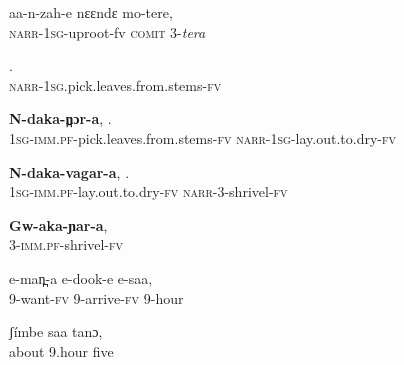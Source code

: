\documentclass[output=paper]{LSP/langsci}
\begin{document}
 \begin{exe}
 \label{Saapp6}
\gll aa-n-zah-e nɛɛndɛ mo-tere,\\
\textsc{narr}-\textsc{1sg}-uproot-fv   \textsc{comit}   \textsc{3}-\textit{tera}\\
\glt {}
\end{exe}

 \begin{exe}
 \label{Saapp7}
\gll \underline{}.\\
\textsc{narr-1sg.}pick.leaves.from.stems\textsc{-fv}\\
\glt {}
\end{exe}

 \begin{exe}
 \label{Saapp8}
\gll \textbf{N-daka-n̪ɔr-a},          \underline{}.\\
\textsc{1sg}-\textsc{imm.pf-}pick.leaves.from.stems-\textsc{fv}  \textsc{narr-1sg}-lay.out.to.dry-\textsc{fv}\\
\glt {}
\end{exe}

 \begin{exe}
 \label{Saapp9}
\gll \textbf{N-daka-vagar-a},      \underline{}.\\
\textsc{1sg-imm.pf-}lay.out.to.dry-\textsc{fv}  \textsc{narr-3}-shrivel-\textsc{fv}\\
\glt {}
\end{exe}

 \begin{exe}
 \label{Saapp10}
\gll \textbf{Gw-aka-ɲar-a},\\
\textsc{3}-\textsc{imm.pf-}shrivel-\textsc{fv}\\
\glt {}
\end{exe}

 \begin{exe}
 \label{Saapp11}
\gll e-man̪-a e-dook-e e-saa,\\
\textsc{9}-want-\textsc{fv}  \textsc{9}-arrive-\textsc{fv}  \textsc{9}-hour\\
\glt {}
\end{exe}

 \begin{exe}
 \label{Saapp12}
\gll ʃímbe saa tanɔ,\\
about \textsc{9}.hour  five\\
\glt {}
\end{exe}
\end{document}
